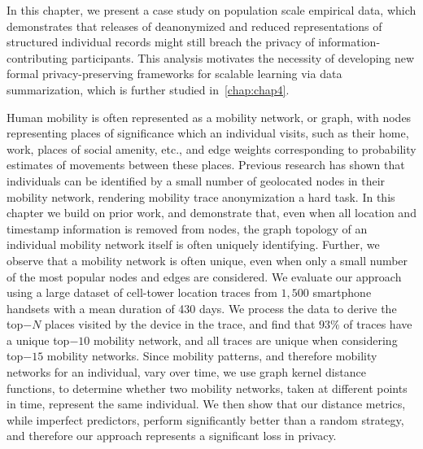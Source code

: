 
In this chapter, we present a case study on population scale empirical data, which demonstrates that releases of deanonymized and reduced representations of structured individual records might still breach the privacy of information-contributing participants. This analysis motivates the necessity of developing new formal privacy-preserving frameworks for scalable learning via data summarization, which is further studied in~\cref{chap:chap4}.

{Human mobility is often represented as a mobility network, or graph, with nodes representing places of significance which an individual visits, such as their home, work, places of social amenity, etc., and edge weights corresponding to probability estimates of movements between these places.
Previous research has shown that individuals can be identified by a small number of geolocated nodes in their mobility network, rendering mobility trace anonymization a hard task.
In this chapter we build on prior work, and demonstrate that, even when all location and timestamp information is removed from nodes, the graph topology of an individual mobility network itself is often uniquely identifying. 
Further, we observe that a mobility network is often unique, even when only a small number of the most popular nodes and edges are considered. 
We evaluate our approach using a large dataset of cell-tower location traces from $1,500$ smartphone handsets with a mean duration of 430 days.
We process the data to derive the top$-N$ places visited by the device in the trace, and find that $93\%$ of traces have a unique top$-10$ mobility network, and all traces are unique when considering top$-15$ mobility networks.
Since mobility patterns, and therefore mobility networks for an individual, vary over time, we use graph kernel distance functions, to determine whether two mobility networks, taken at different points in time, represent the same individual.
We then show that our distance metrics, while imperfect predictors, perform significantly better than a random strategy, and therefore our approach represents a significant loss in privacy.}

